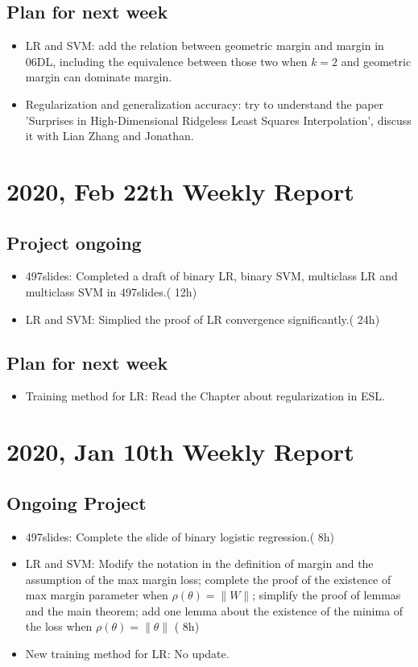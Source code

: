 \documentclass[10pt]{amsart}
\begin{document}
\subsection{Plan for next week}
\begin{itemize}
	\item LR and SVM: add the relation between geometric margin and margin in 06DL, including the equivalence between those two when $k = 2$ and geometric margin can dominate margin.
	\item Regularization and generalization accuracy: try to understand the paper 'Surprises in High-Dimensional Ridgeless Least Squares Interpolation', discuss it with Lian Zhang and Jonathan.
\end{itemize}

\section{2020, Feb 22th Weekly Report }
\subsection{Project ongoing}
\begin{itemize}
	\item {\color{red} 497slides: Completed a draft of binary LR, binary SVM, multiclass LR and multiclass SVM in 497slides.}({\color{blue} 12h})
	\item {\color{red} LR and SVM: Simplied the proof of  LR convergence significantly.}({\color{blue} 24h})
\end{itemize}
\subsection{Plan for next week}
\begin{itemize}
	\item Training method for LR: Read the Chapter about regularization in ESL.
\end{itemize}

\section{2020, Jan 10th Weekly Report }
\subsection{Ongoing Project}
\begin{itemize}
	\item 497slides: {\color{red} Complete the slide of binary logistic regression.}({\color{blue} 8h})
	\item LR and SVM: {\color{red} Modify the notation in the definition of margin and the assumption of the max margin loss; complete the proof of the existence of max margin parameter when $\rho(\theta) = \|W\|$; simplify the proof of lemmas and the main theorem; add one lemma about the existence of the minima of the loss when $\rho(\theta) = \|\theta\|$} ({\color{blue} 8h})
	\item New training method for LR: No update.
\end{itemize}
\end{document}
